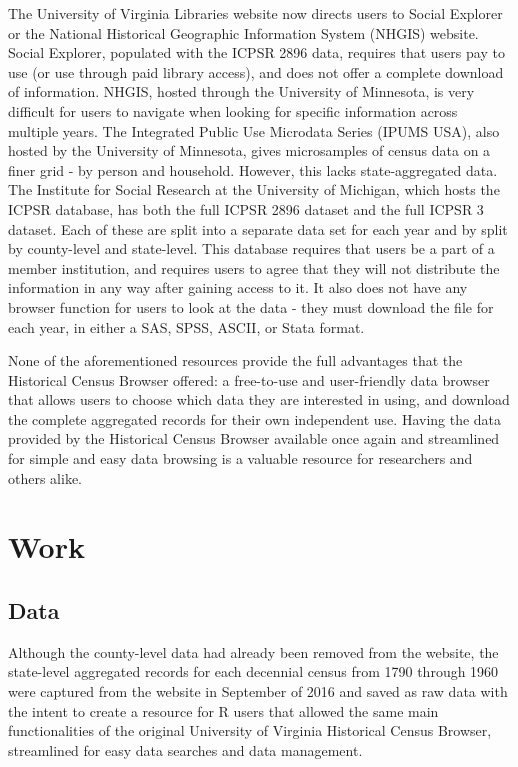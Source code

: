\documentclass[11pt,]{article}
\begin{document}
The University of Virginia Libraries website now directs users to Social
Explorer or the National Historical Geographic Information System
(NHGIS) website. Social Explorer, populated with the ICPSR 2896 data,
requires that users pay to use (or use through paid library access), and
does not offer a complete download of information. NHGIS, hosted through
the University of Minnesota, is very difficult for users to navigate
when looking for specific information across multiple years. The
Integrated Public Use Microdata Series (IPUMS USA), also hosted by the
University of Minnesota, gives microsamples of census data on a finer
grid - by person and household. However, this lacks state-aggregated
data. The Institute for Social Research at the University of Michigan,
which hosts the ICPSR database, has both the full ICPSR 2896 dataset and
the full ICPSR 3 dataset. Each of these are split into a separate data
set for each year and by split by county-level and state-level. This
database requires that users be a part of a member institution, and
requires users to agree that they will not distribute the information in
any way after gaining access to it. It also does not have any browser
function for users to look at the data - they must download the file for
each year, in either a SAS, SPSS, ASCII, or Stata format.

None of the aforementioned resources provide the full advantages that
the Historical Census Browser offered: a free-to-use and user-friendly
data browser that allows users to choose which data they are interested
in using, and download the complete aggregated records for their own
independent use. Having the data provided by the Historical Census
Browser available once again and streamlined for simple and easy data
browsing is a valuable resource for researchers and others alike.

\section{Work}

\subsection{Data}

Although the county-level data had already been removed from the
website, the state-level aggregated records for each decennial census
from 1790 through 1960 were captured from the website in September of
2016 and saved as raw data with the intent to create a resource for R
users that allowed the same main functionalities of the original
University of Virginia Historical Census Browser, streamlined for easy
data searches and data management.
\end{document}
